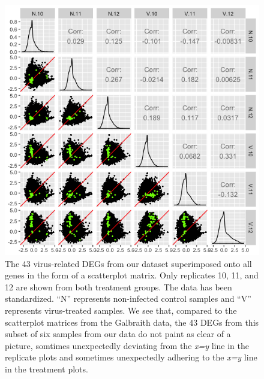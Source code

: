 \documentclass[11pt,a4paper,oldfontcommands,openany]{memoir}
\numberwithin{equation}{section} %
\begin{document}
\begin{figure}[H]
\begin{framed}
  \includegraphics[width=\textwidth]{Images/RutterSM4}
\end{framed}
  \caption{The 43 virus-related DEGs from our dataset superimposed onto all genes in the form of a scatterplot matrix. Only replicates 10, 11, and 12 are shown from both treatment groups. The data has been standardized. ``N'' represents non-infected control samples and ``V'' represents virus-treated samples. We see that, compared to the scatterplot matrices from the Galbraith data, the 43 DEGs from this subset of six samples from our data do not paint as clear of a picture, somtimes unexpectedly deviating from the \textit{x=y} line in the replicate plots and sometimes unexpectedly adhering to the \textit{x=y} line in the treatment plots.}
  \label{fig:RutterSM4}
\end{figure}
\end{document}
